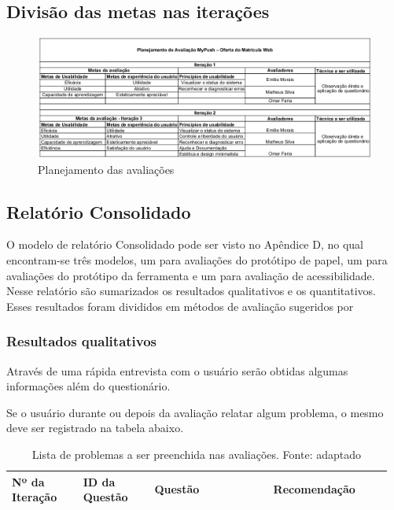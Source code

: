 \subsection{Divisão das metas nas iterações}
\begin{figure}[h!]
  \centering
    \includegraphics[keepaspectratio=true, scale=0.5]{figuras/planejamentoavaliacoes.png}
  \caption{Planejamento das avaliações}
  \label{Planejamento}
\end{figure}

% 

\subsection{Relatório Consolidado}

O modelo de relatório Consolidado pode ser visto no Apêndice D, no qual encontram-se três modelos,
um para avaliações do protótipo de papel, um para avaliações do protótipo da ferramenta e um para avaliação de acessibilidade. Nesse relatório
são sumarizados os resultados qualitativos e os quantitativos. Esses resultados foram divididos em métodos
de avaliação sugeridos por \cite{BARBOSA}

\subsubsection{Resultados qualitativos}

Através de uma rápida entrevista com o usuário serão obtidas algumas informações além do questionário.


Se o usuário durante ou depois da avaliação relatar algum problema, o mesmo deve ser registrado na tabela abaixo.
\begin{table}[!h]
\caption{Lista de problemas a ser preenchida nas avaliações. Fonte: \cite{preece} adaptado}
\label{tab:problema}
  \begin{tabular}{p{0.18\linewidth}p{0.18\linewidth}p{0.30\linewidth}p{0.30\linewidth}}
  \hline
    Nº da Iteração & ID da Questão & Questão & Recomendação\\
 \hline
  \end{tabular}
\end{table}

